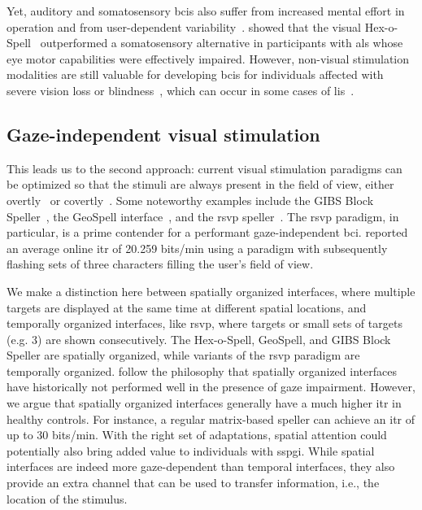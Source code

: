 Yet, auditory and somatosensory \acp{bci} also suffer from increased mental effort in
operation and from user-dependent variability~\cite{Severens2014,Reichert2020b}.
\textcite{Severens2014} showed that the visual Hex-o-Spell~\cite{Treder2010}
outperformed a somatosensory alternative in participants with \ac{als} whose
eye motor capabilities were effectively impaired.
However, non-visual stimulation modalities are still valuable for developing
\acp{bci} for individuals affected with severe vision loss or
blindness~\cite{Nijboer2008,Rutkowski2015}, which can occur in some cases of
\ac{lis}~\cite{Patterson1986}.

\subsection{Gaze-independent visual stimulation}
\label{sec:gaze-independence/sota/visual}

This leads us to the second approach: current visual stimulation paradigms can be optimized so that
the stimuli are always present in the field of view, either overtly~\cite{Acqualagna2013, Won2018, Lin2018} or covertly~\cite{Pires2011,Lees2018}.
Some noteworthy examples include the GIBS Block Speller~\parencite{Pires2011},
the GeoSpell interface~\parencite{Aloise2012}, and the \ac{rsvp}
speller~\parencite{Acqualagna2011}.
The \ac{rsvp} paradigm, in particular, is a prime contender for a performant gaze-independent
\ac{bci}.
\textcite{Lin2018} reported an average online \ac{itr} of 20.259 bits/min using
a paradigm with subsequently flashing sets of three characters filling the user's field of view.

We make a distinction here between spatially organized interfaces, where
multiple targets are displayed at the same time at different spatial locations,
and temporally organized interfaces, like \ac{rsvp}, where targets or small
sets of targets (e.g. 3) are shown consecutively.
The Hex-o-Spell, GeoSpell, and GIBS Block Speller are spatially organized, while
variants of the \ac{rsvp} pa\-ra\-digm are temporally organized.
\textcite{Lin2018} follow the philosophy that spatially organized interfaces
have historically not performed well in the presence of gaze impairment.
However, we argue that spatially organized interfaces generally have a much higher
\ac{itr} in healthy controls.
For instance, a regular matrix-based speller can achieve an \ac{itr} of up to
30 bits/min.
With the right set of adaptations, spatial attention could potentially also
bring added value to individuals with \ac{sspgi}.
While spatial interfaces are indeed more gaze-dependent than temporal
interfaces, they also provide an extra channel that can be used to transfer
information, i.e., the location of the stimulus.

